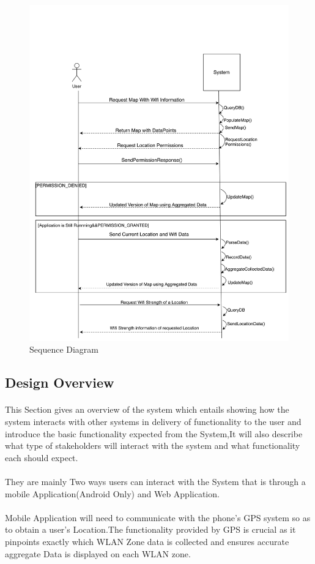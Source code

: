 \begin{figure}
	\centering
	\includegraphics[width=0.7\linewidth]{images/SeqDiagram_Wifi_Mapper}
	\caption{Sequence Diagram}
	\label{fig:seqdiagramwifimapper-1}
\end{figure}

\newpage
\subsection*{Design Overview}
\label{ss:design-overview}
\paragraph{}This Section gives an overview of the system which entails showing how the system interacts with other systems in delivery of functionality to the user and introduce the basic functionality expected from the System,It will also describe what type of stakeholders will interact with the system and what functionality each should expect.

\paragraph{}They are mainly Two ways users can interact with the System that is through a mobile Application(Android Only) and Web Application.

\paragraph{}Mobile Application will need to communicate with the phone's GPS system so as to obtain a user's Location.The functionality provided by GPS is crucial as it pinpoints exactly which WLAN Zone data is collected and ensures accurate aggregate Data is displayed on each WLAN zone.

